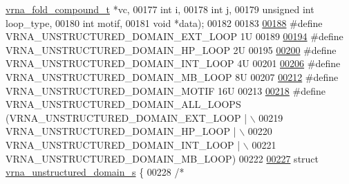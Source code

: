 \begin{DoxyCode}
      \hyperlink{group__fold__compound_structvrna__fc__s}{vrna\_fold\_compound\_t}  *vc,
00177                                                 \textcolor{keywordtype}{int}                   i,
00178                                                 \textcolor{keywordtype}{int}                   j,
00179                                                 \textcolor{keywordtype}{unsigned} \textcolor{keywordtype}{int}          loop\_type,
00180                                                 \textcolor{keywordtype}{int}                   motif,
00181                                                 \textcolor{keywordtype}{void}                  *data);
00182 
00183 
\hyperlink{group__domains__up_gaac911374e86236a51bfd42e1f098eaba}{00188} \textcolor{preprocessor}{#define VRNA\_UNSTRUCTURED\_DOMAIN\_EXT\_LOOP    1U}
00189 
\hyperlink{group__domains__up_ga23b610ea9564346c45cc1e2bbb62adf7}{00194} \textcolor{preprocessor}{#define VRNA\_UNSTRUCTURED\_DOMAIN\_HP\_LOOP     2U}
00195 
\hyperlink{group__domains__up_gac4a0feccd9654c149203200248c2716b}{00200} \textcolor{preprocessor}{#define VRNA\_UNSTRUCTURED\_DOMAIN\_INT\_LOOP    4U}
00201 
\hyperlink{group__domains__up_ga67b80796655e5227a4ed662bfbe398b0}{00206} \textcolor{preprocessor}{#define VRNA\_UNSTRUCTURED\_DOMAIN\_MB\_LOOP     8U}
00207 
\hyperlink{group__domains__up_gaab12b58d59be76446a9f76fad2fe624c}{00212} \textcolor{preprocessor}{#define VRNA\_UNSTRUCTURED\_DOMAIN\_MOTIF       16U}
00213 
\hyperlink{group__domains__up_ga3c6be4cce70f1af9e885788856101699}{00218} \textcolor{preprocessor}{#define VRNA\_UNSTRUCTURED\_DOMAIN\_ALL\_LOOPS   (VRNA\_UNSTRUCTURED\_DOMAIN\_EXT\_LOOP | \(\backslash\)}
00219 \textcolor{preprocessor}{                                              VRNA\_UNSTRUCTURED\_DOMAIN\_HP\_LOOP | \(\backslash\)}
00220 \textcolor{preprocessor}{                                              VRNA\_UNSTRUCTURED\_DOMAIN\_INT\_LOOP | \(\backslash\)}
00221 \textcolor{preprocessor}{                                              VRNA\_UNSTRUCTURED\_DOMAIN\_MB\_LOOP)}
00222 
\hyperlink{group__domains__up}{00227} \textcolor{keyword}{struct }\hyperlink{group__domains__up_structvrna__unstructured__domain__s}{vrna\_unstructured\_domain\_s} \{
00228   \textcolor{comment}{/*}

\end{DoxyCode}
